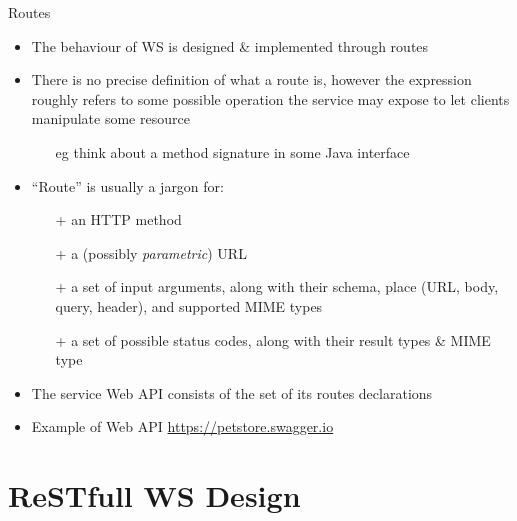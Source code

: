 \documentclass[presentation]{beamer}\mode<presentation>{\usetheme{AMSCesenaPurpleAndGold}}
\begin{document}
\begin{frame}{Routes}
    
    \begin{itemize}
        \item The behaviour of WS is designed \& implemented through \alert{routes}
        
        \vfill
        
        \item There is no precise definition of what a route is, however the expression roughly refers to some \alert{possible operation} the service may expose to let clients manipulate some \alert{resource}
        \begin{itemize}
            \item[eg] think about a method signature in some Java interface
        \end{itemize}
        
        \vfill
        
        \item ``Route'' is usually a \alert{jargon} for:
        \begin{itemize}
            \item[+] an HTTP \alert{method}
            
            \item[+] a (possibly \emph{parametric}) URL
            
            \item[+] a set of input arguments, along with their schema, place (URL, body, query, header), and supported MIME types
            
            \item[+] a set of possible status codes, along with their result types \& MIME type
        \end{itemize}
        
        \vfill
        
        \item The service \alert{Web API} consists of the set of its routes declarations
        
        \vfill
        
        \item Example of \alert{Web API} \url{https://petstore.swagger.io}
    \end{itemize}
    
\end{frame}

\section{ReSTfull WS Design}
\end{document}
